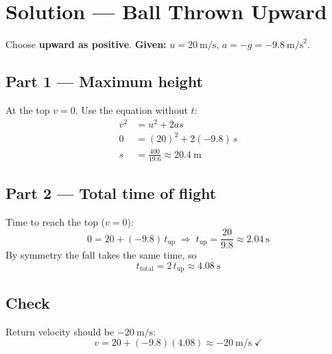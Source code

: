 
\section*{Solution --- Ball Thrown Upward}

Choose \textbf{upward as positive}. \quad
\textbf{Given:} $u = 20\ \text{m/s}$, $a = -g = -9.8\ \text{m/s}^{2}$.

\subsection*{Part 1 --- Maximum height}
At the top $v = 0$. Use the equation without $t$:
\begin{align}
  v^{2} &= u^{2} + 2as \\
  0     &= (20)^{2} + 2(-9.8)\,s \\
  s     &= \frac{400}{19.6} \approx 20.4\ \text{m}
\end{align}

\subsection*{Part 2 --- Total time of flight}
Time to reach the top ($v=0$):
\begin{equation}
  0 = 20 + (-9.8)\,t_{\text{up}}
  \;\Rightarrow\;
  t_{\text{up}} = \frac{20}{9.8} \approx 2.04\ \text{s}
\end{equation}
By symmetry the fall takes the same time, so
\begin{equation}
  t_{\text{total}} = 2\,t_{\text{up}} \approx 4.08\ \text{s}
\end{equation}

\subsection*{Check}
Return velocity should be $-20\ \text{m/s}$:
\begin{equation}
  v = 20 + (-9.8)(4.08) \approx -20\ \text{m/s}\;\checkmark
\end{equation}
